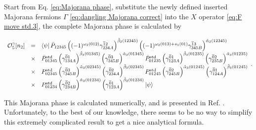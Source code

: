 \documentclass[%
 reprint,
 amsmath,amssymb,
 aps,
prb,
]{revtex4-2}
\begin{document}
Start from Eq. \eqref{eq:Majorana phase}, substitute the newly defined inserted Majorana fermions $\Gamma$ \eqref{eq:dangling Majorana correct} into the $X$ operator \eqref{eq:F move std.3}, the complete Majorana phase is calculated by 
\begin{widetext}
\begin{equation}
\begin{array}{ c c l }
\mathcal{O}_{5}^{\gamma }[ n_2] & = & \bra{\psi }\Bar{P}_{12345} \left( (-1)^{\omega_2(012)} \gamma _{234A}^{\overline{1} 2}\right)^{\tilde{\beta}_{3}( 12345)} \left( (-1)^{\omega_2(013) + s_1(01)} \gamma _{345B}^{\overline{1} 3}\right)^{\tilde{\alpha}_{3}( 12345)}\\
& \times  & \Bar{P}_{01345}^{\mathrm{std}} \left( \gamma _{134A}^{\overline{0} 1}\right)^{\tilde{\beta}_{3}( 01345)} \left( \gamma _{345B}^{\overline{0} 3}\right)^{\tilde{\alpha}_{3}( 01345)} \Bar{P}_{01235}^{\mathrm{std}} \left( \gamma _{123A}^{\overline{0} 1}\right)^{\tilde{\beta}_{3}( 01235)} \left( \gamma _{235B}^{\overline{0} 2}\right)^{\tilde{\alpha}_{3}( 01235)}\\
& \times  & P_{02345}^{\mathrm{std}}\left( \gamma _{345B}^{\overline{0} 3}\right)^{ \tilde{\alpha}_{3}( 02345)} \left( \gamma _{234A}^{\overline{0} 2}\right)^{\tilde{\beta}_{3}( 02345)} P_{01245}^{\mathrm{std}} \left( \gamma _{245B}^{\overline{0} 2}\right)^{\tilde{\alpha}_{3}( 01245)} \left( \gamma _{124A}^{\overline{0} 1}\right)^{\tilde{\beta}_{3}( 01245)}\\
& \times  & P_{01234}^{\mathrm{std}}\left( \gamma _{234B}^{\overline{0} 2}\right)^{\tilde{\alpha}_{3}( 01234)} \left( \gamma _{123A}^{\overline{0} 1}\right)^{\tilde{\beta}_{3}( 01234)} \ket{\psi }
\end{array} .
\end{equation}
\end{widetext}
This Majorana phase is calculated numerically, and is presented in Ref. \cite{Ning2025unpub}.
Unfortunately, to the best of our knowledge, there seems to be no way to simplify this extremely complicated result to get a nice analytical formula.
\end{document}

